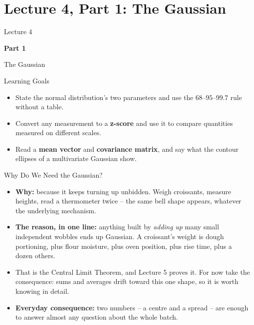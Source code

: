 \section{Lecture 4, Part 1: The Gaussian}

\begin{frame}
\vfill
\centering
{\color{RLBlue}\large Lecture 4}

\vspace{0.3em}
{\color{RLBlue}\Large\bfseries Part 1}

\vspace{0.6em}
{\Large The Gaussian}
\vfill
\end{frame}

\begin{frame}{Learning Goals}
\begin{itemize}
  \item State the normal distribution's two parameters and use the $68$--$95$--$99.7$ rule without a table.
  \pause
  \item Convert any measurement to a \textbf{z-score} and use it to compare quantities measured on different scales.
  \pause
  \item Read a \textbf{mean vector} and \textbf{covariance matrix}, and say what the contour ellipses of a multivariate Gaussian show.
\end{itemize}
\end{frame}

\begin{frame}{Why Do We Need the Gaussian?}
\begin{itemize}
  \item \textbf{Why:} because it keeps turning up unbidden. Weigh croissants, measure heights, read a thermometer twice -- the same bell shape appears, whatever the underlying mechanism.
  \pause
  \item \textbf{The reason, in one line:} anything built by \emph{adding up} many small independent wobbles ends up Gaussian. A croissant's weight is dough portioning, plus flour moisture, plus oven position, plus rise time, plus a dozen others.
  \pause
  \item That is the Central Limit Theorem, and Lecture 5 proves it. For now take the consequence: sums and averages drift toward this one shape, so it is worth knowing in detail.
  \pause
  \item \textbf{Everyday consequence:} two numbers -- a centre and a spread -- are enough to answer almost any question about the whole batch.
\end{itemize}
\end{frame}

